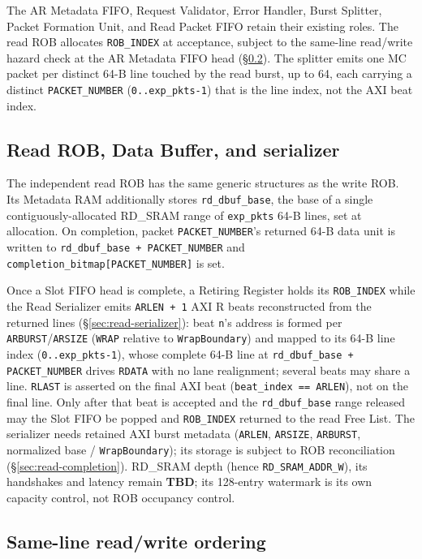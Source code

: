 The AR Metadata FIFO, Request Validator, Error Handler, Burst Splitter,
Packet Formation Unit, and Read Packet FIFO retain their existing roles.  The
read ROB allocates \texttt{ROB\_INDEX} at acceptance, subject to the same-line
read/write hazard check at the AR Metadata FIFO head
(\S\ref{sec:samelinehaz}).  The splitter emits one MC packet per distinct
64-B line touched by the read burst, up to 64, each carrying a distinct
\texttt{PACKET\_NUMBER} (\texttt{0..exp\_pkts-1}) that is the line index, not
the AXI beat index.

\subsection{Read ROB, Data Buffer, and serializer}

The independent read ROB has the same generic structures as the write ROB.
Its Metadata RAM additionally stores \texttt{rd\_dbuf\_base}, the base of a
single contiguously-allocated RD\_SRAM range of \texttt{exp\_pkts} 64-B
lines, set at allocation.  On completion, packet \texttt{PACKET\_NUMBER}'s
returned 64-B data unit is written to \texttt{rd\_dbuf\_base + PACKET\_NUMBER}
and \texttt{completion\_bitmap[PACKET\_NUMBER]} is set.

Once a Slot FIFO head is complete, a Retiring Register holds its
\texttt{ROB\_INDEX} while the Read Serializer emits \texttt{ARLEN + 1} AXI R
beats reconstructed from the returned lines (\S\ref{sec:read-serializer}):
beat \texttt{n}'s address is formed per \texttt{ARBURST}/\texttt{ARSIZE}
(\texttt{WRAP} relative to \texttt{WrapBoundary}) and mapped to its 64-B line
index (\texttt{0..exp\_pkts-1}), whose complete 64-B line at
\texttt{rd\_dbuf\_base + PACKET\_NUMBER} drives \texttt{RDATA} with no lane
realignment; several beats may share a line.  \texttt{RLAST} is asserted on
the final AXI beat (\texttt{beat\_index == ARLEN}), not on the final line.
Only after that beat is accepted and the \texttt{rd\_dbuf\_base} range
released may the Slot FIFO be popped and \texttt{ROB\_INDEX} returned to the
read Free List.  The serializer needs retained AXI burst metadata
(\texttt{ARLEN}, \texttt{ARSIZE}, \texttt{ARBURST}, normalized base /
\texttt{WrapBoundary}); its storage is subject to ROB reconciliation
(\S\ref{sec:read-completion}).  RD\_SRAM depth (hence
\texttt{RD\_SRAM\_ADDR\_W}), its handshakes and latency remain \textbf{TBD};
its 128-entry watermark is its own capacity control, not ROB occupancy
control.

\subsection{Same-line read/write ordering}
\label{sec:samelinehaz}

